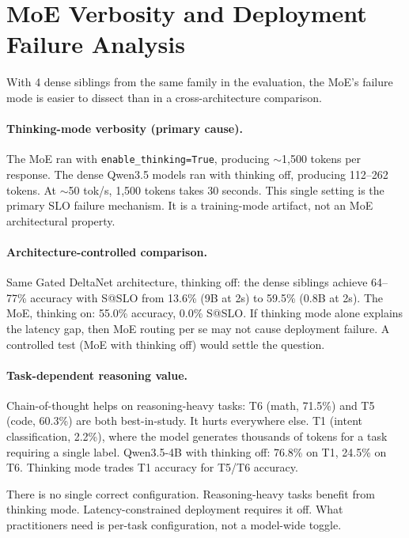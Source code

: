 \documentclass[11pt]{article}
\begin{document}
\section{MoE Verbosity and Deployment Failure Analysis}
\label{app:moe-failure}

With 4 dense siblings from the same family in the evaluation, the MoE's failure mode is easier to dissect than in a cross-architecture comparison.

\paragraph{Thinking-mode verbosity (primary cause).}
The MoE ran with \texttt{enable\_thinking=True}, producing ${\sim}$1,500 tokens per response.  The dense Qwen3.5 models ran with thinking off, producing 112--262 tokens.  At ${\sim}$50 tok/s, 1,500 tokens takes 30 seconds.  This single setting is the primary SLO failure mechanism.  It is a training-mode artifact, not an MoE architectural property.

\paragraph{Architecture-controlled comparison.}
Same Gated DeltaNet architecture, thinking off: the dense siblings achieve 64--77\% accuracy with S@SLO from 13.6\% (9B at 2s) to 59.5\% (0.8B at 2s).  The MoE, thinking on: 55.0\% accuracy, 0.0\% S@SLO.  If thinking mode alone explains the latency gap, then MoE routing per se may not cause deployment failure.  A controlled test (MoE with thinking off) would settle the question.

\paragraph{Task-dependent reasoning value.}
Chain-of-thought helps on reasoning-heavy tasks: T6 (math, 71.5\%) and T5 (code, 60.3\%) are both best-in-study.  It hurts everywhere else.  T1 (intent classification, 2.2\%), where the model generates thousands of tokens for a task requiring a single label.  Qwen3.5-4B with thinking off: 76.8\% on T1, 24.5\% on T6.  Thinking mode trades T1 accuracy for T5/T6 accuracy.

There is no single correct configuration.  Reasoning-heavy tasks benefit from thinking mode.  Latency-constrained deployment requires it off.  What practitioners need is per-task configuration, not a model-wide toggle.
\end{document}
